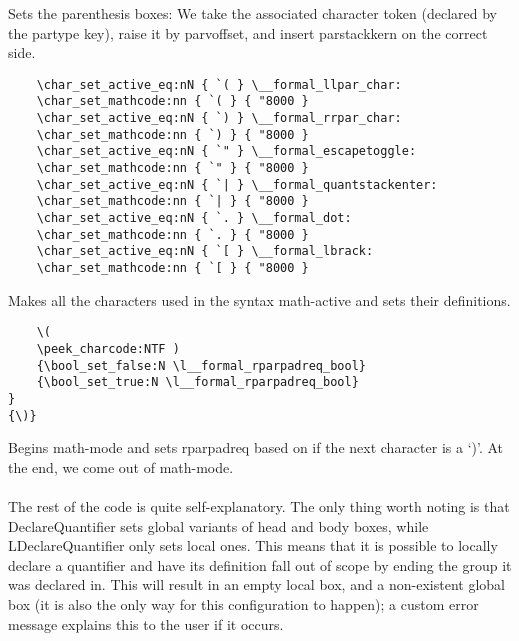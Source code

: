\documentclass{article}
\begin{document}
Sets the parenthesis boxes: We take the associated character token (declared by the partype key), raise it by parvoffset, and insert parstackkern on the correct side.
\begin{Verbatim}
    \char_set_active_eq:nN { `( } \__formal_llpar_char:
    \char_set_mathcode:nn { `( } { "8000 }
    \char_set_active_eq:nN { `) } \__formal_rrpar_char:
    \char_set_mathcode:nn { `) } { "8000 }
    \char_set_active_eq:nN { `" } \__formal_escapetoggle:
    \char_set_mathcode:nn { `" } { "8000 }
    \char_set_active_eq:nN { `| } \__formal_quantstackenter:
    \char_set_mathcode:nn { `| } { "8000 }
    \char_set_active_eq:nN { `. } \__formal_dot:
    \char_set_mathcode:nn { `. } { "8000 }
    \char_set_active_eq:nN { `[ } \__formal_lbrack:
    \char_set_mathcode:nn { `[ } { "8000 }
\end{Verbatim}
Makes all the characters used in the syntax math-active and sets their definitions.
\begin{Verbatim}
    \(
    \peek_charcode:NTF ) 
    {\bool_set_false:N \l__formal_rparpadreq_bool} 
    {\bool_set_true:N \l__formal_rparpadreq_bool}
}
{\)}
\end{Verbatim}
Begins math-mode and sets rparpadreq based on if the next character is a `)'. At the end, we come out of math-mode. 
\\\mbox{}\\\noindent
The rest of the code is quite self-explanatory. The only thing worth noting is that DeclareQuantifier sets global variants of head and body boxes, while LDeclareQuantifier only sets local ones. This means that it is possible to locally declare a quantifier and have its definition fall out of scope by ending the group it was declared in. This will result in an empty local box, and a non-existent global box (it is also the only way for this configuration to happen); a custom error message explains this to the user if it occurs.
\end{document}
